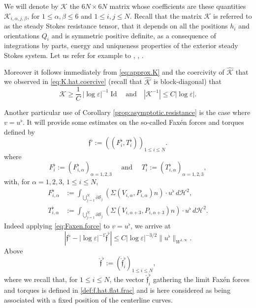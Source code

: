 \documentclass[11pt]{article}
\let\oldbigcup\bigcup
\let\eps\varepsilon
\DeclareMathOperator{\Id}{Id}
\theoremstyle{definition}
\theoremstyle{remark}
\begin{document}
We will denote by $\mathcal K$ the $6N \times 6N$ matrix whose coefficients are these quantities $\mathcal K_{i,\alpha,j,\beta}$, for $1 \leq \alpha,\beta \leq 6$ and $1 \leq i,j \leq N$.
Recall that the matrix $\mathcal K$ is referred to as the steady Stokes resistance tensor, that it depends on all the positions $h_i$ and orientations $Q_i$ and is symmetric positive definite, as a consequence of integrations by parts, energy and uniqueness properties of the exterior steady Stokes system. Let us refer for example to \cite[Chap.\,2]{Kim-Karilla}, \cite[Chap.\,5]{Galdi}, \cite[Chap.\,2 \& 3]{Lady}.

Moreover it follows immediately from \eqref{eq:approx.K} and the coercivity of $\hat{\mathcal K}$ that we observed in \eqref{eq:K.hat.coercive} (recall that $\hat{\mathcal K}$ is block-diagonal) that
\begin{equation}
\mathcal K \geq \frac1C\, \left|\log \eps\right|^{-1} \Id \quad \text{and} \quad | \mathcal K^{-1} |
\leq C {\left|\log \eps\right|}.
\label{eq:K.coercive}
\end{equation}

Another particular use of Corollary \ref{prop:asymptotic.resistance}
is the case where $v=u^\flat$.
It will provide some estimates on the so-called Faxén forces and torques defined by
\begin{equation}\label{clour}
\mathfrak{f}^\flat := ((F^\flat_{i},T^\flat_{i}))_{1 \leq i \leq N}.
\end{equation}
where
\begin{equation}
\label{fab3}
F^\flat_{i} := (F^\flat_{i,\alpha})_{\alpha=1,2,3} \quad \text{ and } \quad T^\flat_{i} := (T^\flat_{i,\alpha})_{\alpha=1,2,3},
\end{equation}
with, for $\alpha=1,2,3$, $1\leq i \leq N$,
\begin{align}
\label{fab1}
F^\flat_{i,\alpha} &:=
\int_{\oldbigcup_{j=1}^N \partial \mathcal S_j } (\Sigma (V_{i,\alpha}, P_{i,\alpha}) n) \cdot u^\flat \, d\mathcal{H}^2,
\\ \label{fab2}
T^\flat_{i,\alpha} &:=
\int_{\oldbigcup_{j=1}^N \partial \mathcal S_j } (\Sigma (V_{i, \alpha +3 }, P_{i, \alpha+3}) n) \cdot u^\flat \, d\mathcal{H}^2.
\end{align}
Indeed
applying \eqref{eq:Faxen.force} to $v=u^\flat$, we arrive at
\begin{equation} \label{ofint}
| \mathfrak{f}^\flat -\left|\log \eps\right|^{-1} \hat{\mathfrak f}^\flat|
\leq C \left|\log \eps\right|^{-3/2} \|u^\flat\|_{W^{1,\infty}}.
\end{equation}
Above
\[
{\hat{\mathfrak{f}}^\flat }
:= (\hat{\mathfrak{f}}_i^\flat)_{1 \leq i \leq N}, \]
where we recall that, for $1 \leq i \leq N$, the vector $\hat{\mathfrak{f}}^\flat_{i} $ gathering the limit Faxén forces and torques is defined in \eqref{def:f.hat.flat.frac} and is here considered as {being} associated with a fixed position of the centerline curves.
\end{document}
